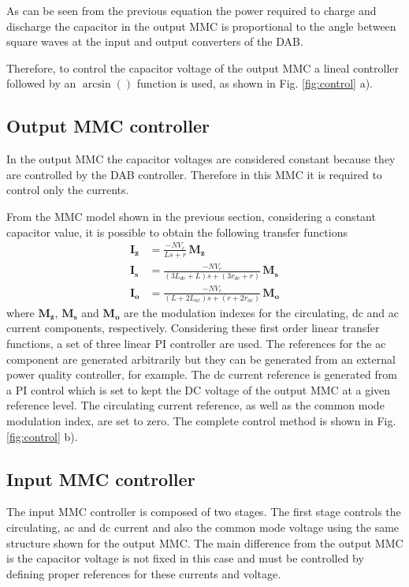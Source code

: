 \documentclass[conference]{IEEEtran}
\begin{document}
As can be seen from the previous equation the  power required to charge and discharge the capacitor in the output MMC is proportional to the angle between square waves at the input and output converters of the DAB.

Therefore, to control the capacitor voltage of the output MMC a lineal controller followed by an $\arcsin()$ function is used, as shown in Fig. \ref{fig:control} a).




\subsection{Output MMC controller}
In the output MMC the capacitor voltages are considered constant because they are controlled by the DAB controller. Therefore in this MMC it is required to control only the currents.
 
From the MMC model shown in the previous section, considering a constant capacitor value, it is possible to obtain the following transfer functions
\begin{align}
\mathbf{I_z}&=\frac{-NV_c}{L s+r}\,\mathbf{M_z}\\
\mathbf{I_s}&=\frac{-NV_c}{(3L_{dc}+L)s+(3r_{dc}+r)}\,\mathbf{M_s}\\
\mathbf{I_o}&=\frac{-NV_c}{(L+2L_{ac})s+(r+2r_{ac})}\,\mathbf{M_o}
\end{align}
where $\mathbf{M_z}$, $\mathbf{M_s}$ and $\mathbf{M_o}$ are the modulation indexes for the circulating, dc and ac current components, respectively. Considering these first order linear transfer functions, a set of three linear PI controller are used. The references for the ac component are generated arbitrarily but they can be generated from an external  power quality controller, for example. The dc current reference is generated from a PI control which is set to kept the DC voltage of the output MMC at a given reference level.  The circulating current reference, as well as the common mode modulation index, are set to zero. The complete control method is shown in Fig. \ref{fig:control} b).


\subsection{Input MMC controller}
The input MMC controller is composed of two stages. The first stage controls the circulating, ac and dc current and also the common mode voltage using the same structure shown for the output MMC. The main difference from the output MMC is the capacitor voltage is not fixed in this case and must be controlled by defining proper references for these currents and voltage.
\end{document}
